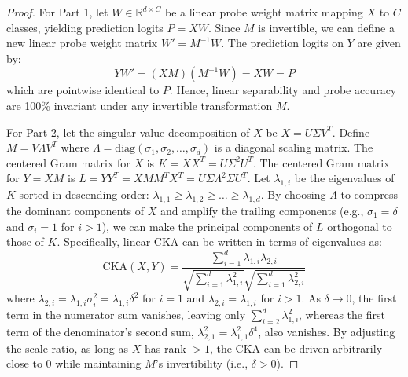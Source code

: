 \documentclass{article}
\theoremstyle{plain}
\theoremstyle{definition}
\theoremstyle{remark}
\begin{document}
\begin{proof}
For Part 1, let $W \in \mathbb{R}^{d \times C}$ be a linear probe weight matrix mapping $X$ to $C$ classes, yielding prediction logits $P = X W$. Since $M$ is invertible, we can define a new linear probe weight matrix $W' = M^{-1} W$. The prediction logits on $Y$ are given by:
\begin{equation}
  Y W' = (X M) (M^{-1} W) = X W = P
\end{equation}
which are pointwise identical to $P$. Hence, linear separability and probe accuracy are 100\% invariant under any invertible transformation $M$.

For Part 2, let the singular value decomposition of $X$ be $X = U \Sigma V^T$. Define $M = V \Lambda V^T$ where $\Lambda = \text{diag}(\sigma_1, \sigma_2, \dots, \sigma_d)$ is a diagonal scaling matrix. 
The centered Gram matrix for $X$ is $K = X X^T = U \Sigma^2 U^T$. The centered Gram matrix for $Y = X M$ is $L = Y Y^T = X M M^T X^T = U \Sigma \Lambda^2 \Sigma U^T$. 
Let $\lambda_{1,i}$ be the eigenvalues of $K$ sorted in descending order: $\lambda_{1,1} \geq \lambda_{1,2} \geq \dots \geq \lambda_{1,d}$. 
By choosing $\Lambda$ to compress the dominant components of $X$ and amplify the trailing components (e.g., $\sigma_1 = \delta$ and $\sigma_i = 1$ for $i > 1$), we can make the principal components of $L$ orthogonal to those of $K$. 
Specifically, linear CKA can be written in terms of eigenvalues as:
\begin{equation}
  \text{CKA}(X, Y) = \frac{\sum_{i=1}^d \lambda_{1,i} \lambda_{2,i}}{\sqrt{\sum_{i=1}^d \lambda_{1,i}^2} \sqrt{\sum_{i=1}^d \lambda_{2,i}^2}}
\end{equation}
where $\lambda_{2,i} = \lambda_{1,i} \sigma_i^2 = \lambda_{1,i} \delta^2$ for $i=1$ and $\lambda_{2,i} = \lambda_{1,i}$ for $i > 1$. As $\delta \to 0$, the first term in the numerator sum vanishes, leaving only $\sum_{i=2}^d \lambda_{1,i}^2$, whereas the first term of the denominator's second sum, $\lambda_{2,1}^2 = \lambda_{1,1}^2 \delta^4$, also vanishes. By adjusting the scale ratio, as long as $X$ has rank $> 1$, the CKA can be driven arbitrarily close to 0 while maintaining $M$'s invertibility (i.e., $\delta > 0$).
\end{proof}
\end{document}
